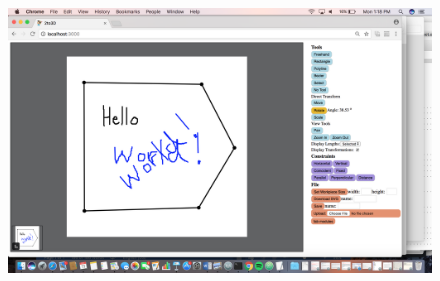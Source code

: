 \begin{figure}[H]
  \includegraphics[width=\linewidth]{screenshot2.png}
  \caption{}
  \label{fig:screenshot2}
\end{figure}

